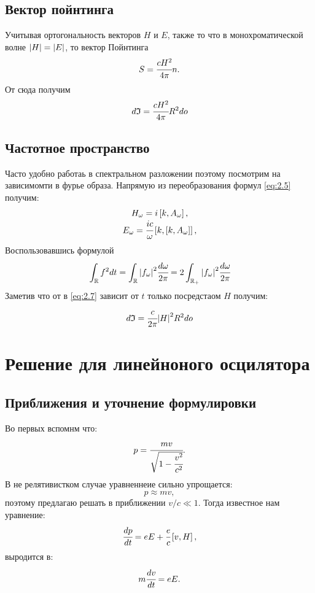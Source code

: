 \documentclass[a4paper]{article}
\newcommand{\insqr}[1]{\left[ #1 \right]}
\newcommand{\re}{\mathbb{R}}
\numberwithin{equation}{section}
\begin{document}
\subsection{Вектор пойнтинга}
Учитывая ортогональность векторов $H$ и $E$, также то что в 
монохроматической волне $\abs{H} = \abs{E}$, то вектор Пойнтинга
\begin{equation}
    S = \cfrac{cH^2}{4\pi}n.
\end{equation}
От сюда получим 
\begin{equation}
    d\mathfrak{I} = \cfrac{cH^2}{4\pi}R^2do
    \label{eq:2.7}
\end{equation}

\subsection{Частотное пространство}

Часто удобно работаь в спектральном разложении поэтому посмотрим 
на зависимомти в фурье образа. Напрямую из переобразования формул 
\ref{eq:2.5} получим:
\begin{gather}
    \begin{matrix}
        H_\omega = i \insqr{k, A_\omega},\\
        E_\omega = \cfrac{ic}{\omega} \insqr{k, \insqr{k, A_\omega}},
    \end{matrix}
\end{gather}
Воспользовавшись формулой 
\begin{equation}
    \int_\re f^2 dt = \int_\re \abs{f_\omega}^2 \cfrac{d\omega}{2\pi} 
    = 2\int_{\re_+} \abs{f_\omega}^2 \cfrac{d\omega}{2\pi} 
\end{equation}
Заметив что от в \ref{eq:2.7}  зависит от $t$ только посредстаом $H$ 
получим:
\begin{equation}
    d\mathfrak{I} = \cfrac{c}{2\pi} \abs{H}^2R^2do
    \label{eq:if}
\end{equation}



\section{Решение для линейноного осцилятора}
\subsection{Приближения и уточнение формулировки}

Во первых вспомнм что:
\begin{equation}
    p  = \cfrac{mv}{\sqrt{1 - \cfrac{v^2}{c^2}}}.
\end{equation}
В не релятивистком случае уравненнеие сильно упрощается:
\begin{equation}
    p \approx mv,
\end{equation}
поэтому предлагаю решать в приближении $v/c \ll 1$.
Тогда известное нам уравнение:
\begin{equation}
    \cfrac{dp}{dt} = e  E + \cfrac{e}{c} \insqr{ v,  H},
\end{equation}
выродится в: 
\begin{equation}
    m\cfrac{dv}{dt} = e  E.
\end{equation}
\end{document}
